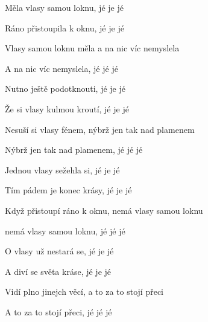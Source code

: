 \begin{song}


\begin{hchordbox}
\end{hchordbox}

\Large

\bigskip

Měla vlasy samou loknu, jé je jé \par
{}Ráno přistoupila k oknu, jé je jé \par
{}Vlasy samou loknu měla a na nic víc nemyslela \par
{}A na nic víc nemyslela, jé jé jé \par

\bigskip


\bigskip

Nutno ještě podotknouti, jé je jé \par
{}Že si vlasy kulmou kroutí, jé je jé \par
{}Nesuší si vlasy fénem, nýbrž jen tak nad plamenem \par
{}Nýbrž jen tak nad plamenem, jé jé jé \par

\bigskip


\bigskip

Jednou vlasy sežehla si, jé je jé \par
{}Tím pádem je konec krásy, jé je jé \par
{}Když přistoupí ráno k oknu, nemá vlasy samou loknu \par
{}nemá vlasy samou loknu, jé jé jé \par

\bigskip


\bigskip

O vlasy už nestará se, jé je jé \par
{}A diví se světa kráse, jé je jé \par
{}Vidí plno jinejch věcí, a to za to stojí přeci \par
{}A to za to stojí přeci, jé jé jé \par


\end{song}
